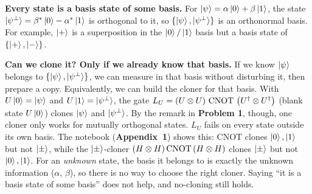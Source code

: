 \documentclass[a4paper, 10pt]{article}
\begin{document}
\begin{solution}
	\noindent \textbf{Every state is a basis state of some basis.} For \( \ket{\psi} = \alpha\ket{0} + \beta\ket{1} \), the state \( \ket{\psi^{\perp}} = \beta^{*}\ket{0} - \alpha^{*}\ket{1} \) is orthogonal to it, so \( \{\ket{\psi}, \ket{\psi^{\perp}}\} \) is an orthonormal basis.
	For example, \( \ket{+} \) is a superposition in the \( \ket{0}/\ket{1} \) basis but a basis state of \( \{\ket{+}, \ket{-}\} \).

	\noindent \textbf{Can we clone it? Only if we already know that basis.} If we know \( \ket{\psi} \) belongs to \( \{\ket{\psi}, \ket{\psi^{\perp}}\} \), we can measure in that basis without disturbing it, then prepare a copy. Equivalently, we can build the cloner for that basis.
	With \( U\ket{0} = \ket{\psi} \) and \( U\ket{1} = \ket{\psi^{\perp}} \), the gate \( L_U = \left(U \otimes U\right)\,\mathrm{CNOT}\,\left(U^{\dagger} \otimes U^{\dagger}\right) \) (blank state \( U\ket{0} \)) clones \( \ket{\psi} \) and \( \ket{\psi^{\perp}} \).
	By the remark in \textbf{Problem 1}, though, one cloner only works for mutually orthogonal states. \( L_U \) fails on every state outside its own basis.
	The notebook (\textbf{Appendix~1}) shows this: CNOT clones \( \ket{0}, \ket{1} \) but not \( \ket{\pm} \), while the \( \ket{\pm} \)-cloner \( \left(H \otimes H\right)\mathrm{CNOT}\left(H \otimes H\right) \) clones \( \ket{\pm} \) but not \( \ket{0}, \ket{1} \).
	For an \emph{unknown} state, the basis it belongs to is exactly the unknown information (\( \alpha \), \( \beta \)), so there is no way to choose the right cloner. Saying ``it is a basis state of some basis'' does not help, and no-cloning still holds.


\end{solution}
\end{document}
